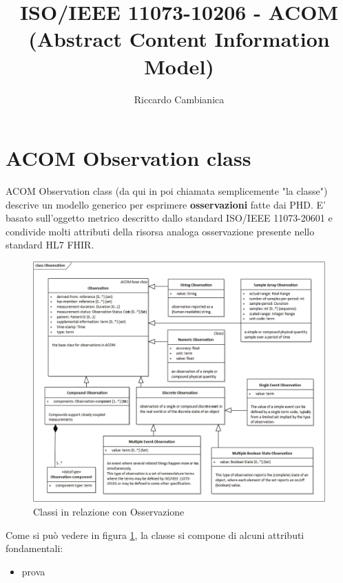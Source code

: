 \documentclass{article}
\title{ISO/IEEE 11073-10206 - ACOM (Abstract Content Information Model)}
\author{Riccardo Cambianica}
\begin{document}
    \maketitle
    \newpage
    \tableofcontents\newpage
    \section{ACOM Observation class}
        ACOM Observation class (da qui in poi chiamata semplicemente "la classe") descrive un modello generico per esprimere \textbf{osservazioni} fatte dai PHD. E' basato sull'oggetto metrico descritto dallo standard ISO/IEEE 11073-20601 e condivide molti attributi della risorsa analoga osservazione presente nello standard HL7 FHIR.
        \begin{figure}[H]
            \centering
            \includegraphics[width=1\textwidth]{figures/observation class.png}
            \caption{Classi in relazione con Osservazione}
            \label{fig:observationClass}
        \end{figure}
        Come si può vedere in figura \ref{fig:observationClass}, la classe si compone di alcuni attributi fondamentali: 
        \begin{itemize}
            \item prova 
        \end{itemize}
\end{document}
